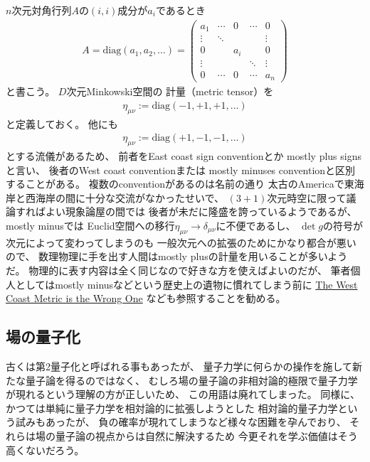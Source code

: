 $n$次元対角行列$A$の$(i,i)$成分が$a_i$であるとき
\begin{align}
    A = \mathrm{diag}(a_1, a_2,\dots)
    =
    \begin{pmatrix}
        a_{1}  & \cdots & 0      & \cdots & 0
        \\
        \vdots & \ddots &        &        & \vdots
        \\
        0      &        & a_{i}  &        & 0
        \\
        \vdots &        &        & \ddots & \vdots
        \\
        0      & \cdots & 0      & \cdots & a_{n}
    \end{pmatrix}
\end{align}
と書こう。
$D$次元Minkowski空間の
計量（metric tensor）を
\begin{align}
    \eta_{\mu\nu}
    :=
    \mathrm{diag}(-1, +1, +1, \dots)
\end{align}
と定義しておく。
他にも
\begin{align}
    \eta_{\mu\nu}
    :=
    \mathrm{diag}(+1, -1, -1, \dots)
\end{align}
とする流儀があるため、
前者をEast coast sign conventionとか
mostly plus signsと言い、
後者のWest coast conventionまたは
mostly minuses conventionと区別することがある。
複数のconventionがあるのは名前の通り
太古のAmericaで東海岸と西海岸の間に十分な交流がなかったせいで、
$(3+1)$次元時空に限って議論すればよい現象論屋の間では
後者が未だに隆盛を誇っているようであるが、
mostly minusでは
Euclid空間への移行$\eta_{\mu\nu} \to \delta_{\mu\nu}$に不便であるし、
$\det g$の符号が次元によって変わってしまうのも
一般次元への拡張のためにかなり都合が悪いので、
数理物理に手を出す人間はmostly plusの計量を用いることが多いようだ。
物理的に表す内容は全く同じなので好きな方を使えばよいのだが、
筆者個人としてはmostly minusなどという歴史上の遺物に慣れてしまう前に
\href{http://www.math.columbia.edu/~woit/wordpress/?p=7773}
{The West Coast Metric is the Wrong One}
なども参照することを勧める。

\subsection{場の量子化}

古くは第2量子化と呼ばれる事もあったが、
量子力学に何らかの操作を施して新たな量子論を得るのではなく、
むしろ場の量子論の非相対論的極限で量子力学が現れるという理解の方が正しいため、
この用語は廃れてしまった。
同様に、かつては単純に量子力学を相対論的に拡張しようとした
相対論的量子力学という試みもあったが、
負の確率が現れてしまうなど様々な困難を孕んでおり、
それらは場の量子論の視点からは自然に解決するため
今更それを学ぶ価値はそう高くないだろう。

